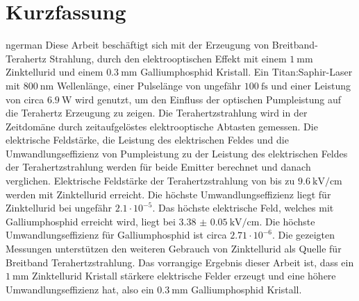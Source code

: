 \section*{Kurzfassung}
\begin{foreignlanguage}{ngerman}
Diese Arbeit beschäftigt sich mit der Erzeugung von Breitband-Terahertz Strahlung, durch den elektrooptischen Effekt mit einem $\SI{1}{\milli\meter}$ Zinktellurid und einem $\SI{0.3}{\milli\meter}$ Galliumphosphid Kristall.
Ein Titan:Saphir-Laser mit $\SI{800}{\nano\meter}$ Wellenlänge, einer Pulselänge von ungefähr $\SI{100}{\femto\second}$ und einer Leistung von circa $\SI{6.9}{\W}$ wird genutzt, um den Einfluss der optischen Pumpleistung auf die Terahertz Erzeugung zu zeigen.
Die Terahertzstrahlung wird in der Zeitdomäne durch zeitaufgelöstes elektrooptische Abtasten gemessen.
Die elektrische Feldstärke, die Leistung des elektrischen Feldes und die Umwandlungseffizienz von Pumpleistung zu der Leistung des elektrischen Feldes der Terahertzstrahlung werden für beide Emitter berechnet und danach verglichen.
Elektrische Feldstärke der Terahertzstrahlung von bis zu $\SI{9.6}{\kilo\V\per\centi\meter}$ werden mit Zinktellurid erreicht.
Die höchste Umwandlungseffizienz liegt für Zinktellurid bei ungefähr $2.1\cdot 10^{-5}$.
Das höchste elektrische Feld, welches mit Galliumphosphid erreicht wird, liegt bei $\SI{3.38(5)}{\kilo\V\per\centi\meter}$.
Die höchste Umwandlungseffizienz für Galliumphosphid ist circa $2.71\cdot 10^{-6}$.
Die gezeigten Messungen unterstützen den weiteren Gebrauch von Zinktellurid als Quelle für Breitband Terahertzstrahlung.
Das vorrangige Ergebnis dieser Arbeit ist, dass ein  $\SI{1}{\milli\meter}$ Zinktellurid Kristall stärkere elektrische Felder erzeugt und eine höhere Umwandlungseffizienz hat, also ein $\SI{0.3}{\milli\meter}$ Galliumphosphid Kristall.
\end{foreignlanguage}